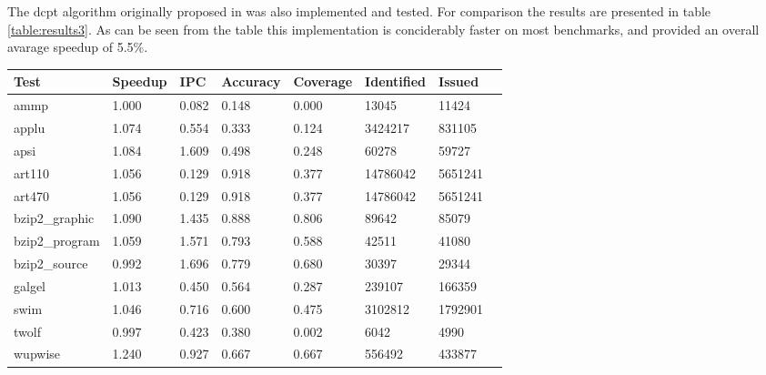 The dcpt algorithm originally proposed in \cite{reference:jahr} was also implemented and tested. For comparison the results are presented in table \ref{table:results3}. As can be seen from the table this implementation is conciderably faster on most benchmarks, and provided an overall avarage speedup of 5.5\%.

\begin{table*}[!t]
\renewcommand{\arraystretch}{1.3}
\caption{DCPT Prefetcher results}
\label{table:results3}
\centering
\begin{tabular}{|l|l|l|l|l|l|l|l|}
\hline
\bfseries Test & \bfseries Speedup & \bfseries IPC & \bfseries Accuracy & \bfseries Coverage & \bfseries Identified & \bfseries Issued\\
\hline
\hline
ammp 		& 1.000 & 	0.082 &	0.148 &	0.000 &	13045 &	11424\\
applu 		& 1.074 & 	0.554 &	0.333 &	0.124 &	3424217 & 	831105\\
apsi 		& 1.084 & 	1.609 &	0.498 &	0.248 &	60278 &	59727\\	
art110 		& 1.056 & 	0.129 &	0.918 &	0.377 &	14786042 &	5651241\\	
art470 		& 1.056 & 	0.129 &	0.918 &	0.377 &	14786042 &	5651241\\
bzip2\_graphic 	& 1.090 & 	1.435 &	0.888 &	0.806 &	89642 &	85079 	\\
bzip2\_program 	& 1.059 & 	1.571 &	0.793 &	0.588 &	42511 &	41080 	\\
bzip2\_source 	& 0.992 & 	1.696 &	0.779 &	0.680 &	30397 &	29344\\
galgel 		& 1.013 & 	0.450 &	0.564 &	0.287 &	239107 &	 166359\\
swim 		& 1.046 & 	0.716 &	0.600 &	0.475 &	3102812 & 	1792901\\
twolf 		& 0.997 & 	0.423 &	0.380 &	0.002 &	6042 &	4990 		\\
wupwise 	& 1.240 & 	0.927 &	0.667 &	0.667 &	556492 & 	433877 	\\
\hline
\end{tabular}
\end{table*}





